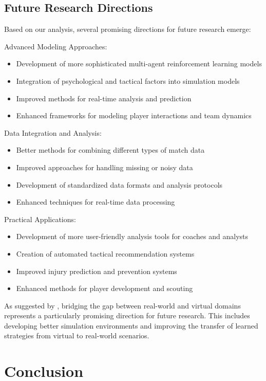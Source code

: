 \documentclass[10pt,journal,compsoc]{IEEEtran}
\begin{document}
\subsection{Future Research Directions}
Based on our analysis, several promising directions for future research emerge:

Advanced Modeling Approaches:
\begin{itemize}
    \item Development of more sophisticated multi-agent reinforcement learning models
    \item Integration of psychological and tactical factors into simulation models
    \item Improved methods for real-time analysis and prediction
    \item Enhanced frameworks for modeling player interactions and team dynamics
\end{itemize}

Data Integration and Analysis:
\begin{itemize}
    \item Better methods for combining different types of match data
    \item Improved approaches for handling missing or noisy data
    \item Development of standardized data formats and analysis protocols
    \item Enhanced techniques for real-time data processing
\end{itemize}

Practical Applications:
\begin{itemize}
    \item Development of more user-friendly analysis tools for coaches and analysts
    \item Creation of automated tactical recommendation systems
    \item Improved injury prediction and prevention systems
    \item Enhanced methods for player development and scouting
\end{itemize}

As suggested by \cite{pu2024orientation}, bridging the gap between real-world and virtual domains represents a particularly promising direction for future research. This includes developing better simulation environments and improving the transfer of learned strategies from virtual to real-world scenarios.

\section{Conclusion}
\end{document}
